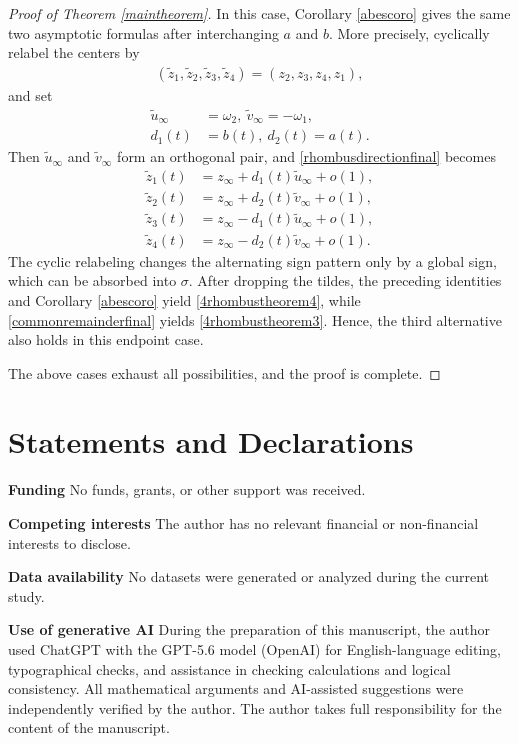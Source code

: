 \documentclass[reqno]{amsart}
\theoremstyle{plain}
\theoremstyle{definition}
\numberwithin{equation}{section}
\begin{document}
\begin{proof}[Proof of Theorem \ref{maintheorem}]
In this case, Corollary \ref{abescoro} gives the same two asymptotic formulas after interchanging $a$ and $b$. More precisely, cyclically relabel the centers by
\begin{align*}
(\tilde{z}_1,\tilde{z}_2,\tilde{z}_3,\tilde{z}_4)=(z_2,z_3,z_4,z_1),
\end{align*}
and set
\begin{align*}
\tilde{u}_{\infty}&=\omega_2,\ \tilde{v}_{\infty}=-\omega_1,
\\
d_1(t)&=b(t),\ d_2(t)=a(t).
\end{align*}
Then $\tilde{u}_{\infty}$ and $\tilde{v}_{\infty}$ form an orthogonal pair, and \eqref{rhombusdirectionfinal} becomes
\begin{align*}
\tilde{z}_1(t)
&=z_{\infty}
+d_1(t)\tilde{u}_{\infty}+o(1),
\\
\tilde{z}_2(t)
&=z_{\infty}
+d_2(t)\tilde{v}_{\infty}+o(1),
\\
\tilde{z}_3(t)
&=z_{\infty}
-d_1(t)\tilde{u}_{\infty}+o(1),
\\
\tilde{z}_4(t)
&=z_{\infty}
-d_2(t)\tilde{v}_{\infty}+o(1).
\end{align*}
The cyclic relabeling changes the alternating sign pattern only by a global sign, which can be absorbed into $\sigma$. After dropping the tildes, the preceding identities and Corollary \ref{abescoro} yield \eqref{4rhombustheorem4}, while
\eqref{commonremainderfinal} yields \eqref{4rhombustheorem3}. Hence, the third alternative also holds
in this endpoint case.

The above cases exhaust all possibilities, and the proof is complete.

\end{proof}


\section*{Statements and Declarations}

\textbf{Funding} No funds, grants, or other support was received.

\textbf{Competing interests} The author has no relevant financial or non-financial interests to disclose.

\textbf{Data availability} No datasets were generated or analyzed during the current study.

\textbf{Use of generative AI} During the preparation of this manuscript, the author used ChatGPT with the GPT-5.6 model (OpenAI) for English-language editing, typographical checks, and assistance in checking calculations and logical consistency. All mathematical arguments and AI-assisted suggestions were independently verified by the author. The author takes full responsibility for the content of the manuscript.
\end{document}
